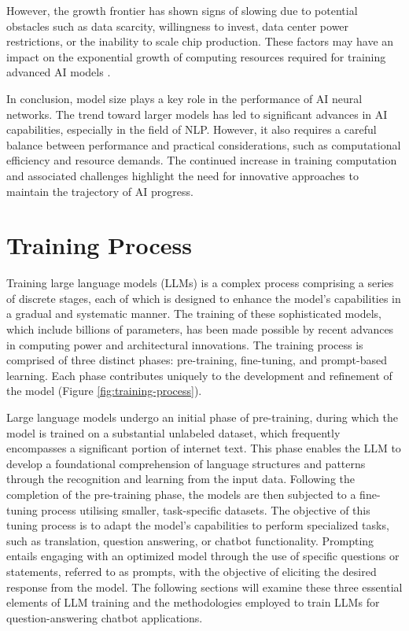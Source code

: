 However, the growth frontier has shown signs of slowing due to potential obstacles such as data scarcity, willingness to invest, data center power restrictions, or the inability to scale chip production. These factors may have an impact on the exponential growth of computing resources required for training advanced AI models \cite{epoch2024trainingcomputeoffrontieraimodelsgrowsby45xperyear}.

In conclusion, model size plays a key role in the performance of AI neural networks. The trend toward larger models has led to significant advances in AI capabilities, especially in the field of NLP. However, it also requires a careful balance between performance and practical considerations, such as computational efficiency and resource demands. The continued increase in training computation and associated challenges highlight the need for innovative approaches to maintain the trajectory of AI progress.

\section{Training Process}

Training large language models (LLMs) is a complex process comprising a series of discrete stages, each of which is designed to enhance the model's capabilities in a gradual and systematic manner. The training of these sophisticated models, which include billions of parameters, has been made possible by recent advances in computing power and architectural innovations. The training process is comprised of three distinct phases: pre-training, fine-tuning, and prompt-based learning. Each phase contributes uniquely to the development and refinement of the model (Figure \ref{fig:training-process}).

Large language models undergo an initial phase of pre-training, during which the model is trained on a substantial unlabeled dataset, which frequently encompasses a significant portion of internet text. This phase enables the LLM to develop a foundational comprehension of language structures and patterns through the recognition and learning from the input data. Following the completion of the pre-training phase, the models are then subjected to a fine-tuning process utilising smaller, task-specific datasets. The objective of this tuning process is to adapt the model's capabilities to perform specialized tasks, such as translation, question answering, or chatbot functionality. Prompting entails engaging with an optimized model through the use of specific questions or statements, referred to as prompts, with the objective of eliciting the desired response from the model. The following sections will examine these three essential elements of LLM training and the methodologies employed to train LLMs for question-answering chatbot applications.


